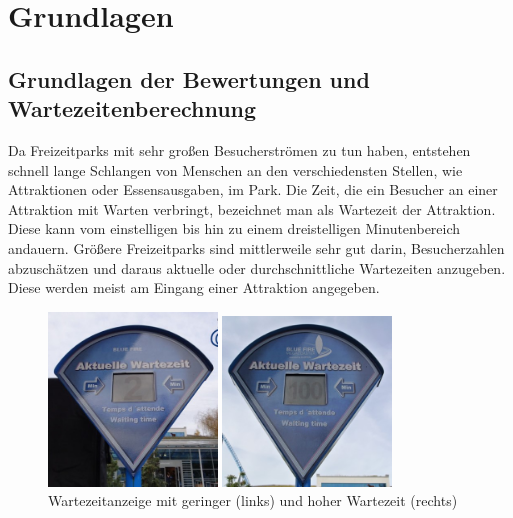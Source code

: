 \chapter{Grundlagen}
\label{cha:grundlagen}

\section{Grundlagen der Bewertungen und Wartezeitenberechnung}
\label{sec:grundlagen:bewertugnen}

Da Freizeitparks mit sehr großen Besucherströmen zu tun haben, entstehen schnell lange Schlangen von Menschen an den verschiedensten Stellen, wie Attraktionen oder Essensausgaben, im Park. Die Zeit, die ein Besucher an einer Attraktion mit Warten verbringt, bezeichnet man als Wartezeit der Attraktion. Diese kann vom einstelligen bis hin zu einem dreistelligen Minutenbereich andauern. Größere Freizeitparks sind mittlerweile sehr gut darin, Besucherzahlen abzuschätzen und daraus aktuelle oder durchschnittliche Wartezeiten anzugeben. Diese werden meist am Eingang einer Attraktion angegeben.

\begin{figure}[h]
    \centering
    \begin{minipage}{0.49\textwidth}
        \centering
        \includegraphics[width=0.4\textwidth]{img/motivation/wartezeit_2.jpg}
    \end{minipage}
    \begin{minipage}{0.49\textwidth}
        \centering
        \includegraphics[width=0.4\textwidth]{img/motivation/wartezeit_100.jpg}
    \end{minipage}
\caption[Wartezeitanzeige im Park]{Wartezeitanzeige mit geringer (links) und hoher Wartezeit (rechts)\footnotemark}
		\label{figure:grundlagenwaittime}
\end{figure}

